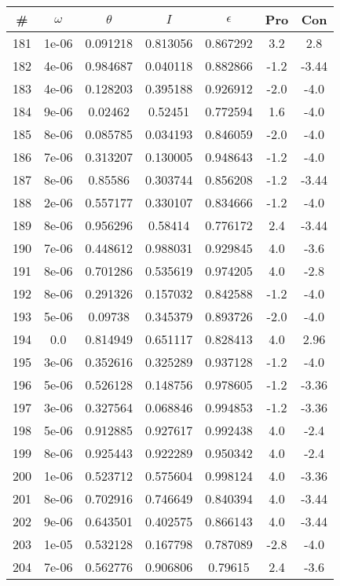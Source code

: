 \begin{table}
\begin{tabular}{c|c|c|c|c|c|c}
\# & $\omega$ & $\theta$ & $I$ & $\epsilon$ & Pro & Con\\
\hline
181 & 1e-06 & 0.091218 & 0.813056 & 0.867292 & 3.2 & 2.8\\
182 & 4e-06 & 0.984687 & 0.040118 & 0.882866 & -1.2 & -3.44\\
183 & 4e-06 & 0.128203 & 0.395188 & 0.926912 & -2.0 & -4.0\\
184 & 9e-06 & 0.02462 & 0.52451 & 0.772594 & 1.6 & -4.0\\
185 & 8e-06 & 0.085785 & 0.034193 & 0.846059 & -2.0 & -4.0\\
186 & 7e-06 & 0.313207 & 0.130005 & 0.948643 & -1.2 & -4.0\\
187 & 8e-06 & 0.85586 & 0.303744 & 0.856208 & -1.2 & -3.44\\
188 & 2e-06 & 0.557177 & 0.330107 & 0.834666 & -1.2 & -4.0\\
189 & 8e-06 & 0.956296 & 0.58414 & 0.776172 & 2.4 & -3.44\\
190 & 7e-06 & 0.448612 & 0.988031 & 0.929845 & 4.0 & -3.6\\
191 & 8e-06 & 0.701286 & 0.535619 & 0.974205 & 4.0 & -2.8\\
192 & 8e-06 & 0.291326 & 0.157032 & 0.842588 & -1.2 & -4.0\\
193 & 5e-06 & 0.09738 & 0.345379 & 0.893726 & -2.0 & -4.0\\
194 & 0.0 & 0.814949 & 0.651117 & 0.828413 & 4.0 & 2.96\\
195 & 3e-06 & 0.352616 & 0.325289 & 0.937128 & -1.2 & -4.0\\
196 & 5e-06 & 0.526128 & 0.148756 & 0.978605 & -1.2 & -3.36\\
197 & 3e-06 & 0.327564 & 0.068846 & 0.994853 & -1.2 & -3.36\\
198 & 5e-06 & 0.912885 & 0.927617 & 0.992438 & 4.0 & -2.4\\
199 & 8e-06 & 0.925443 & 0.922289 & 0.950342 & 4.0 & -2.4\\
200 & 1e-06 & 0.523712 & 0.575604 & 0.998124 & 4.0 & -3.36\\
201 & 8e-06 & 0.702916 & 0.746649 & 0.840394 & 4.0 & -3.44\\
202 & 9e-06 & 0.643501 & 0.402575 & 0.866143 & 4.0 & -3.44\\
203 & 1e-05 & 0.532128 & 0.167798 & 0.787089 & -2.8 & -4.0\\
204 & 7e-06 & 0.562776 & 0.906806 & 0.79615 & 2.4 & -3.6\\

\end{tabular}
\end{table}
